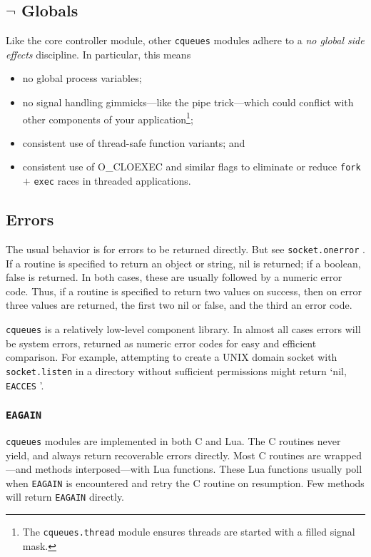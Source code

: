 \documentclass[11pt, oneside]{memoir}
\newcommand{\cqueues}[0]{\texttt{cqueues} }
\newcommand{\syscall}[1]{\texttt{#1} }
\newcommand{\routine}[1]{\texttt{#1} }
\newcommand{\module}[1]{\texttt{#1} }
\newcommand{\errno}[1]{\texttt{#1} }
\begin{document}
\subsection{$\lnot$ Globals}

Like the core controller module, other \cqueues modules adhere to a \emph{no global side effects} discipline. In particular, this means
\begin{itemize}
\item no global process variables;
\item no signal handling gimmicks---like the pipe trick---which could conflict with other components of your application\footnote{The \module{cqueues.thread} module ensures threads are started with a filled signal mask.};
\item consistent use of thread-safe function variants; and
\item consistent use of O\_CLOEXEC and similar flags to eliminate or reduce \syscall{fork} $+$ \syscall{exec} races in threaded applications.
\end{itemize}

\subsection{Errors}

The usual behavior is for errors to be returned directly. But see \routine{socket.onerror}. If a routine is specified to return an object or string, nil is returned; if a boolean, false is returned. In both cases, these  are usually followed by a numeric error code. Thus, if a routine is specified to return two values on success, then on error three values are returned, the first two nil or false, and the third an error code.

\cqueues is a relatively low-level component library. In almost all cases errors will be system errors, returned as numeric error codes for easy and efficient comparison. For example, attempting to create a UNIX domain socket with \routine{socket.listen} in a directory without sufficient permissions might return `nil, \errno{EACCES}'.

\subsubsection{\texttt{EAGAIN}}

\cqueues modules are implemented in both C and Lua. The C routines never yield, and always return recoverable errors directly. Most C routines are wrapped---and methods interposed---with Lua functions. These Lua functions usually poll when \errno{EAGAIN} is encountered and retry the C routine on resumption. Few methods will return \errno{EAGAIN} directly.
\end{document}
